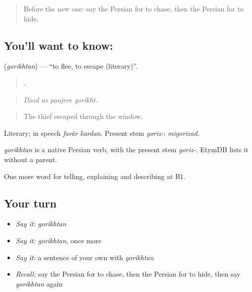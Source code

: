 \label{lesson:FA-C317-gorikhtan}



\begin{quote}
Before the new one: say the Persian for to chase, then the Persian for to hide.
\end{quote}

\subsection*{You'll want to know: }
\textbf{} (\emph{gorikhtan}) — \textquotedblleft{}to flee, to escape (literary)\textquotedblright{}.

\begin{quote}
   .
\end{quote}

\begin{quote}
\emph{Dozd az panjere gorikht.}
\end{quote}

\begin{quote}
The thief escaped through the window.
\end{quote}

Literary; in speech \emph{farâr kardan}. Present stem \emph{goriz-}: \emph{migorizad}.

\begin{cousinweb}
\emph{gorikhtan} is a native Persian verb, with the present stem \emph{goriz-}. EtymDB lists it without a parent.
\end{cousinweb}

\begin{grammarlens}[title={What you've built}]
One more word for telling, explaining and describing at B1.
\end{grammarlens}

\subsection*{Your turn}
\begin{itemize}
\raggedright
  \item \emph{Say it:} \emph{gorikhtan}
  \item \emph{Say it:} \emph{gorikhtan}, once more
  \item \emph{Say it:} a sentence of your own with \emph{gorikhtan}
  \item \emph{Recall:} say the Persian for to chase, then the Persian for to hide, then say \emph{gorikhtan} again
\end{itemize}

